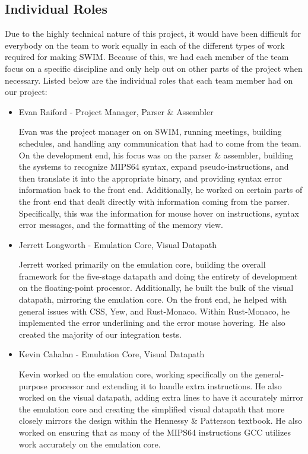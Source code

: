 \documentclass[
    paper=letter,
    parskip=half,
    fontsize=12pt,
    titlepage=firstiscover,
    toc=bibliography,
    numbers=endperiod
]{scrartcl}
\begin{document}
\subsection {Individual Roles}
Due to the highly technical nature of this project, it would have been
difficult for everybody on the team to work equally in each of the
different types of work required for making SWIM. Because of this, we
had each member of the team focus on a specific discipline and only help
out on other parts of the project when necessary. Listed below are the
individual roles that each team member had on our project:

\begin{itemize}
    \item Evan Raiford - Project Manager, Parser \& Assembler

          Evan was the project manager on on SWIM, running meetings, building
          schedules, and handling any communication that had to come from the
          team. On the development end, his focus was on the parser \& assembler,
          building the systems to recognize MIPS64 syntax, expand
          pseudo-instructions, and then translate it into the appropriate binary,
          and providing syntax error information back to the front end.
          Additionally, he worked on certain parts of the front end that dealt
          directly with information coming from the parser. Specifically, this was
          the information for mouse hover on instructions, syntax error messages,
          and the formatting of the memory view.

    \item Jerrett Longworth - Emulation Core, Visual Datapath

          Jerrett worked primarily on the emulation core, building the overall
          framework for the five-stage datapath and doing the entirety of
          development on the floating-point processor. Additionally, he built the
          bulk of the visual datapath, mirroring the emulation core. On the front
          end, he helped with general issues with CSS, Yew, and Rust-Monaco.
          Within Rust-Monaco, he implemented the error underlining and the error
          mouse hovering. He also created the majority of our integration tests.

    \item Kevin Cahalan - Emulation Core, Visual Datapath

          Kevin worked on the emulation core, working specifically on the
          general-purpose processor and extending it to handle extra instructions.
          He also worked on the visual datapath, adding extra lines to have it
          accurately mirror the emulation core and creating the simplified visual
          datapath that more closely mirrors the design within the Hennessy \&
          Patterson textbook. He also worked on ensuring that as many of the
          MIPS64 instructions GCC utilizes work accurately on the emulation core.


\end{itemize}
\end{document}
